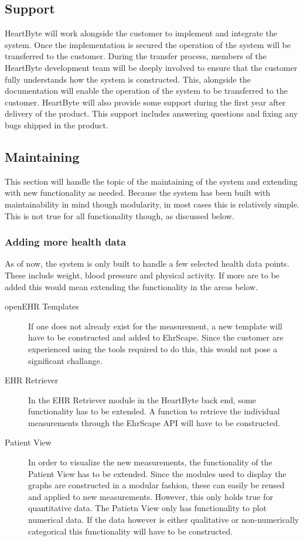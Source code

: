 \documentclass{article}
\begin{document}
\subsection{Support}
HeartByte will work alongside the customer to implement and integrate the system. Once the implementation is secured the operation of the system will be transferred to the customer. During the transfer process, members of the HeartByte development team will be deeply involved to ensure that the customer fully understands how the system is constructed. This, alongside the documentation will enable the operation of the system to be transferred to the customer. HeartByte will also provide some support during the first year after delivery of the product. This support includes answering questions and fixing any bugs shipped in the product.

\subsection{Maintaining}
This section will handle the topic of the maintaining of the system and extending with new functionality as needed. Because the system has been built with maintainability in mind though modularity, in most cases this is relatively simple. This is not true for all functionality though, as discussed below.

\subsubsection{Adding more health data}
As of now, the system is only built to handle a few selected health data points. These include weight, blood pressure and
physical activity. If more are to be added this would mean extending the functionality in the areas below.

\begin{description}
\item [openEHR Templates] If one does not already exist for the measurement, a new template will have to be constructed and added to EhrScape. Since the customer are experienced using the tools required to do this, this would not pose a significant challange.

\item [EHR Retriever] In the EHR Retriever module in the HeartByte back end, some functionality has to be extended. A function to retrieve the individual measurements through the EhrScape API will have to be constructed.

\item [Patient View] In order to visualize the new measurements, the functionality of the Patient View has to be extended. Since the modules used to display the graphs are constructed in a modular fashion, these can easily be reused and applied to new measurements. However, this only holds true for quantitative data. The Patietn View only has functionality to plot numerical data. If the data however is either qualitative or non-numerically categorical this functionality will have to be constructed.
\end{description}
\end{document}
